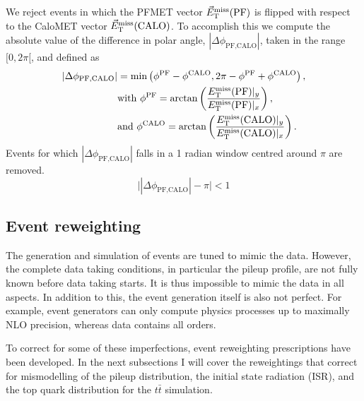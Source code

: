 We reject events in which the PFMET vector ${\vec E}_{\mathrm{T}}^{\text{miss}}(\textrm{PF})$ is flipped with
respect to the CaloMET vector ${\vec E}_{\mathrm{T}}^{\text{miss}}(\textrm{CALO})$. 
To accomplish this we compute the absolute value of the difference in polar angle,
 $|\Delta\phi_{\textrm{PF,CALO}}|$, taken in the range $[0,2\pi[$, and defined as
\begin{align}
|\Delta\phi_{\textrm{PF,CALO}}| &= \min \left ( \phi^{\textrm{PF}} - \phi^{\textrm{CALO}},   2\pi -
\phi^{\textrm{PF}} + \phi^{\textrm{CALO}} \right) ,\\
&\textrm{with } \phi^{\textrm{PF}} = \textrm{arctan} \left( \frac{E_{\mathrm{T}}^{\text{miss}}(\textrm{PF})|_y}
{E_{\mathrm{T}}^{\text{miss}}(\textrm{PF})|_x} \right) , \\
&\textrm{and } \phi^{\textrm{CALO}} = \textrm{arctan}\left( \frac{E_{\mathrm{T}}^{\text{miss}}(\textrm{CALO})|_y}
{E_{\mathrm{T}}^{\text{miss}}(\textrm{CALO})|_x} \right) .
\end{align}
Events for which $|\Delta\phi_{\textrm{PF,CALO}}|$ falls in a 1 radian window centred around $\pi$
are removed. 
\begin{equation}
\bigl| |\Delta\phi_{\textrm{PF,CALO}}| - \pi \bigr| < 1
\label{eqn:dphicut}
\end{equation}


\subsection{Event reweighting \label{sec:event_reweighting}}

The generation and simulation of events are tuned to mimic the data. However, the complete data
taking conditions, in particular the pileup profile, are not fully known before data
taking starts. It is thus impossible to mimic the data in all aspects. 
In addition to this, the event generation itself is also not perfect. For example, event generators
can only compute physics processes up to maximally NLO precision, whereas data contains all orders. 

To correct for some of these imperfections, event reweighting prescriptions have been developed. 
In the next subsections I will cover the reweightings that correct for mismodelling of the pileup
distribution, the initial state radiation (ISR), and the top quark \pt distribution for the
$t\bar{t}$ simulation.


